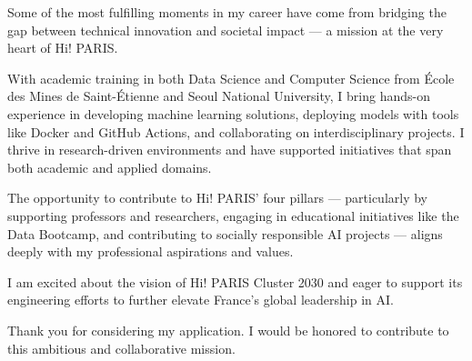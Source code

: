 
\newcommand{\Company}{Hi!Paris}
\recipient{\RecruitmentTeam{\Company}}{\Company\\Palaiseau\\ France}
\makelettertitle

Some of the most fulfilling moments in my career have come from bridging the gap between technical innovation and societal impact — a mission at the very heart of Hi! PARIS.

With academic training in both Data Science and Computer Science from École des Mines de Saint-Étienne and Seoul National University, I bring hands-on experience in developing machine learning solutions, deploying models with tools like Docker and GitHub Actions, and collaborating on interdisciplinary projects. I thrive in research-driven environments and have supported initiatives that span both academic and applied domains.

The opportunity to contribute to Hi! PARIS’ four pillars — particularly by supporting professors and researchers, engaging in educational initiatives like the Data Bootcamp, and contributing to socially responsible AI projects — aligns deeply with my professional aspirations and values.

I am excited about the vision of Hi! PARIS Cluster 2030 and eager to support its engineering efforts to further elevate France’s global leadership in AI.

Thank you for considering my application. I would be honored to contribute to this ambitious and collaborative mission.

\makeletterclosing
